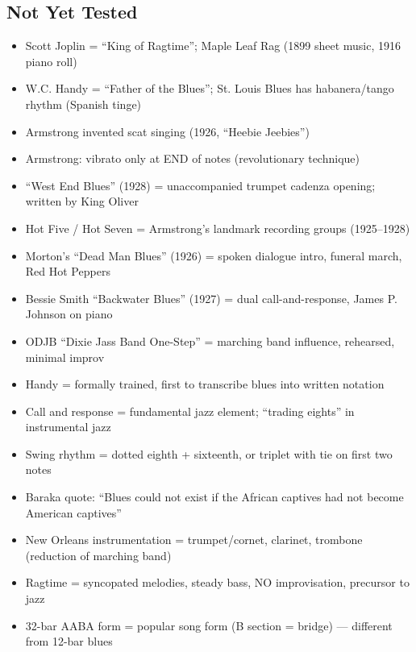 \documentclass[11pt, letterpaper]{article}
\begin{document}
\subsection*{\textcolor{grayzone}{Not Yet Tested}}
\begin{itemize}[label=$\square$]
    \item Scott Joplin = ``King of Ragtime''; Maple Leaf Rag (1899 sheet music, 1916 piano roll)
    \item W.C. Handy = ``Father of the Blues''; St. Louis Blues has habanera/tango rhythm (Spanish tinge)
    \item Armstrong invented scat singing (1926, ``Heebie Jeebies'')
    \item Armstrong: vibrato only at END of notes (revolutionary technique)
    \item ``West End Blues'' (1928) = unaccompanied trumpet cadenza opening; written by King Oliver
    \item Hot Five / Hot Seven = Armstrong's landmark recording groups (1925--1928)
    \item Morton's ``Dead Man Blues'' (1926) = spoken dialogue intro, funeral march, Red Hot Peppers
    \item Bessie Smith ``Backwater Blues'' (1927) = dual call-and-response, James P. Johnson on piano
    \item ODJB ``Dixie Jass Band One-Step'' = marching band influence, rehearsed, minimal improv
    \item Handy = formally trained, first to transcribe blues into written notation
    \item Call and response = fundamental jazz element; ``trading eights'' in instrumental jazz
    \item Swing rhythm = dotted eighth + sixteenth, or triplet with tie on first two notes
    \item Baraka quote: ``Blues could not exist if the African captives had not become American captives''
    \item New Orleans instrumentation = trumpet/cornet, clarinet, trombone (reduction of marching band)
    \item Ragtime = syncopated melodies, steady bass, NO improvisation, precursor to jazz
    \item 32-bar AABA form = popular song form (B section = bridge) --- different from 12-bar blues
\end{itemize}

\newpage

\end{document}
